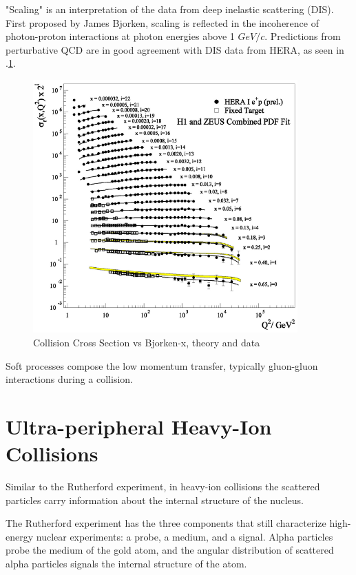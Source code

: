 "Scaling" is an interpretation of the data from deep inelastic scattering (DIS). First proposed by James Bjorken, scaling is reflected in the incoherence of photon-proton interactions at photon energies above 1 $GeV/c$. Predictions from perturbative QCD are in good agreement with DIS data from HERA, as seen in .\ref{fig:qcdBjorkenX}.

\begin{figure}[h!]
\begin{centering}
\includegraphics[width=4in]{Chapter1/importfigs/scholarpedia_bjorken_x_qcdExp.png}
\par\end{centering}
\caption{Collision Cross Section vs Bjorken-x, theory and data \label{fig:qcdBjorkenX}}
\end{figure}

Soft processes compose the low momentum transfer, typically gluon-gluon interactions during a  collision.

\section{Ultra-peripheral Heavy-Ion Collisions}

Similar to the Rutherford experiment, in heavy-ion collisions the scattered particles carry information about the internal structure of the nucleus. 

The Rutherford experiment has the three components that still characterize high-energy nuclear experiments: a probe, a medium, and a signal. Alpha particles probe the medium of the gold atom, and the angular distribution of scattered alpha particles signals the internal structure of the atom. 

